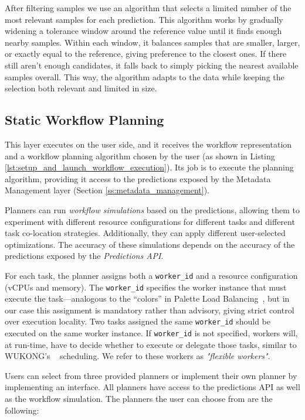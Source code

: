 \documentclass[conference]{IEEEtran}
\begin{document}
After filtering samples we use an algorithm that selects a limited number of the most relevant samples for each prediction. This algorithm works by gradually widening a tolerance window around the reference value until it finds enough nearby samples. Within each window, it balances samples that are smaller, larger, or exactly equal to the reference, giving preference to the closest ones. If there still aren't enough candidates, it falls back to simply picking the nearest available samples overall. This way, the algorithm adapts to the data while keeping the selection both relevant and limited in size.

\subsection{Static Workflow Planning}
This layer executes on the user side, and it receives the workflow representation and a workflow planning algorithm chosen by the user (as shown in Listing \ref{lst:setup_and_launch_workflow_execution}). Its job is to execute the planning algorithm, providing it access to the predictions exposed by the Metadata Management layer (Section \ref{ss:metadata_management}).

Planners can run \textit{workflow simulations} based on the predictions, allowing them to experiment with different resource configurations for different tasks and different task co-location strategies. Additionally, they can apply different user-selected optimizations. The accuracy of these simulations depends on the accuracy of the predictions exposed by the \textit{Predictions API}.

For each task, the planner assigns both a \texttt{worker\_id} and a resource configuration (vCPUs and memory). The \texttt{worker\_id} specifies the worker instance that must execute the task—analogous to the “colors” in Palette Load Balancing~\cite{palette_load_balancing}, but in our case this assignment is mandatory rather than advisory, giving strict control over execution locality. Two tasks assigned the same \texttt{worker\_id} should be executed on the same worker instance. If \texttt{worker\_id} is not specified, workers will, at run-time, have to decide whether to execute or delegate those tasks, similar to WUKONG's ~\cite{wukong_2} scheduling. We refer to these workers as \textit{"flexible workers"}.

Users can select from three provided planners or implement their own planner by implementing an interface. All planners have access to the predictions API as well as the workflow simulation. The planners the user can choose from are the following:
\end{document}
